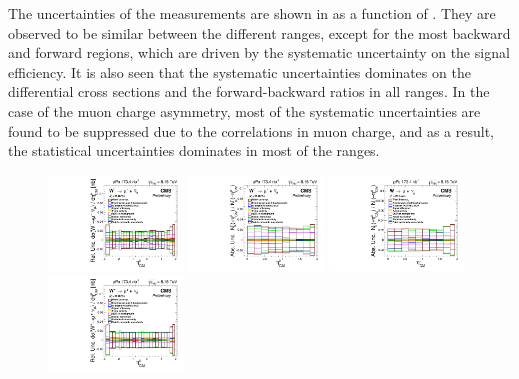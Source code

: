 

The uncertainties of the measurements are shown in  as a function of \etaMuCM. They are observed to be similar between the different \etaMuCM ranges, except for the most backward and forward regions, which are driven by the systematic uncertainty on the signal efficiency. It is also seen that the systematic uncertainties dominates on the \WToMuNupm differential cross sections and the forward-backward ratios in all \etaMuCM ranges. In the case of the muon charge asymmetry, most of the systematic uncertainties are found to be suppressed due to the correlations in muon charge, and as a result, the statistical uncertainties dominates in most of the \etaMuCM ranges.


\begin{figure}[htb!]
 \centering
 \includegraphics[width=0.32\textwidth]{Figures/WBoson/Analysis/Systematics/gr_WToMuMi_PA_Cross_Section_EffTnP.pdf}
 \includegraphics[width=0.32\textwidth]{Figures/WBoson/Analysis/Systematics/gr_WToMuMi_PA_ForwardBackward_Ratio_EffTnP.pdf}
 \includegraphics[width=0.32\textwidth]{Figures/WBoson/Analysis/Systematics/gr_WToMuInc_PA_ForwardBackward_Ratio_EffTnP.pdf}
 \includegraphics[width=0.32\textwidth]{Figures/WBoson/Analysis/Systematics/gr_WToMuPl_PA_Cross_Section_EffTnP.pdf}

\end{figure}
